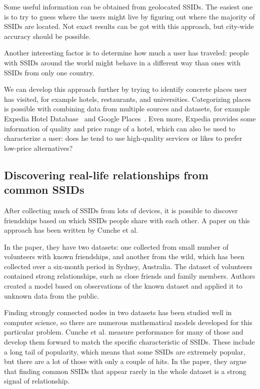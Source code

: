 \documentclass[12pt,a4paper,oneside,pdftex]{report}
\begin{document}
Some useful information can be obtained from geolocated SSIDs. The easiest one is to try to guess where the users might live by figuring out where the majority of SSIDs are located. Not exact results can be got with this approach, but city-wide accuracy should be possible.

Another interesting factor is to determine how much a user has traveled: people with SSIDs around the world might behave in a different way than ones with SSIDs from only one country. 

We can develop this approach further by trying to identify concrete places user has visited, for example hotels, restaurants, and universities. Categorizing places is possible with combining data from multiple sources and datasets, for example Expedia Hotel Database~\cite{expedia_hotel_db} and Google Places~\cite{google_places}. Even more, Expedia provides some information of quality and price range of a hotel, which can also be used to characterize a user: does he tend to use high-quality services or likes to prefer low-price alternatives?

\subsection{Discovering real-life relationships from common SSIDs}
\label{subsec:ssid_commons}

After collecting much of SSIDs from lots of devices, it is possible to discover friendships based on which SSIDs people share with each other. A paper on this approach has been written by Cunche et al.~\cite{cunche2014linking}

In the paper, they have two datasets: one collected from small number of volunteers with known friendships, and another from the wild, which has been collected over a six-month period in Sydney, Australia. The dataset of volunteers contained strong relationships, such as close friends and family members. Authors created a model based on observations of the known dataset and applied it to unknown data from the public.

Finding strongly connected nodes in two datasets has been studied well in computer science, so there are numerous mathematical models developed for this particular problem. Cunche et al. measure performance for many of those and develop them forward to match the specific characteristic of SSIDs. These include a long tail of popularity, which means that some SSIDs are extremely popular, but there are a lot of those with only a couple of hits. In the paper, they argue that finding common SSIDs that appear rarely in the whole dataset is a strong signal of relationship. 
\end{document}
